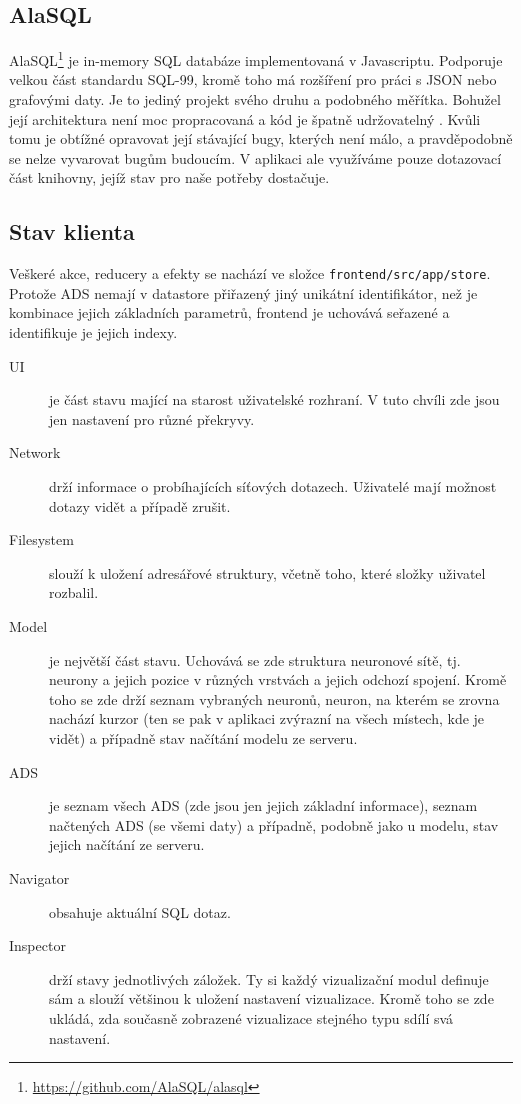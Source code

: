 \subsection{AlaSQL}

AlaSQL\footnote{\url{https://github.com/AlaSQL/alasql}} je in-memory SQL databáze implementovaná v Javascriptu. Podporuje velkou část standardu SQL-99, kromě toho má rozšíření pro práci s JSON nebo grafovými daty. Je to jediný projekt svého druhu a podobného měřítka. Bohužel její architektura není moc propracovaná a kód je špatně udržovatelný \cite{AlaSQLIssue}. Kvůli tomu je obtížné opravovat její stávající bugy, kterých není málo, a pravděpodobně se nelze vyvarovat bugům budoucím. V aplikaci ale využíváme pouze dotazovací část knihovny, jejíž stav pro naše potřeby dostačuje.

\subsection{Stav klienta}

Veškeré akce, reducery a efekty se nachází ve složce \lstinline|frontend/src/app/store|. Protože ADS nemají v datastore přiřazený jiný unikátní identifikátor, než je kombinace jejich základních parametrů, frontend je uchovává seřazené a identifikuje je jejich indexy.

\begin{description}
  \item[UI] je část stavu mající na starost uživatelské rozhraní. V tuto chvíli zde jsou jen nastavení pro různé překryvy.
  \item[Network] drží informace o probíhajících síťových dotazech. Uživatelé mají možnost dotazy vidět a případě zrušit.
  \item[Filesystem] slouží k uložení adresářové struktury, včetně toho, které složky uživatel rozbalil.
  \item[Model] je největší část stavu. Uchovává se zde struktura neuronové sítě, tj. neurony a jejich pozice v různých vrstvách a jejich odchozí spojení. Kromě toho se zde drží seznam vybraných neuronů, neuron, na kterém se zrovna nachází kurzor (ten se pak v aplikaci zvýrazní na všech místech, kde je vidět) a případně stav načítání modelu ze serveru.
  \item[ADS] je seznam všech ADS (zde jsou jen jejich základní informace), seznam načtených ADS (se všemi daty) a případně, podobně jako u modelu, stav jejich načítání ze serveru.
  \item[Navigator] obsahuje aktuální SQL dotaz.
  \item[Inspector] drží stavy jednotlivých záložek. Ty si každý vizualizační modul definuje sám a slouží většinou k uložení nastavení vizualizace. Kromě toho se zde ukládá, zda současně zobrazené vizualizace stejného typu sdílí svá nastavení.
\end{description}

